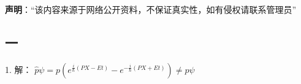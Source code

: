 
\textbf{声明}：“该内容来源于网络公开资料，不保证真实性，如有侵权请联系管理员”


\subsection{一}
1. 解：
 $\hat{p} \psi = p\left(e^{\frac{i}{\hbar}(PX - Et)} - e^{-\frac{i}{\hbar}(PX + Et)}\right) \neq p\psi$


